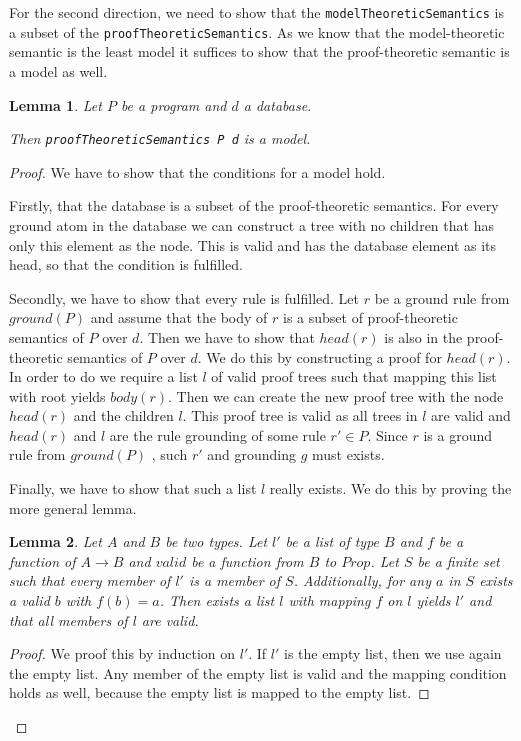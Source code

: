 \documentclass{article}
\newtheorem{lemma}{Lemma}
\begin{document}
        For the second direction, we need to show that the \texttt{modelTheoreticSemantics} is a subset of the \texttt{proofTheoreticSemantics}. As we know that the model-theoretic semantic is the least model it suffices to show that the proof-theoretic semantic is a model as well.

        \begin{lemma}
            Let $P$ be a program and $d$ a database.

            Then \texttt{proofTheoreticSemantics P d} is a model.
        \end{lemma}
        \begin{proof}
            We have to show that the conditions for a model hold.

            Firstly, that the database is a subset of the proof-theoretic semantics. For every ground atom in the database we can construct a tree with no children that has only this element as the node. This is valid and has the database element as its head, so that the condition is fulfilled.

            Secondly, we have to show that every rule is fulfilled. Let $r$ be a ground rule from $ground(P)$ and assume that the body of $r$ is a subset of proof-theoretic semantics of $P$ over $d$. Then we have to show that $head(r)$ is also in the proof-theoretic semantics of $P$ over $d$. We do this by constructing a proof for $head(r)$. In order to do we require a list $l$ of valid proof trees such that mapping this list with root yields $body(r)$. Then we can create the new proof tree with the node $head(r)$ and the children $l$. This proof tree is valid as all trees in $l$ are valid and $head(r)$ and $l$ are the rule grounding of some rule $r' \in P$. Since $r$ is a ground rule from $ground(P)$ , such $r'$ and grounding $g$ must exists.

            Finally, we have to show that such a list $l$ really exists. We do this by proving the more general lemma.

            \begin{lemma}
                Let $A$ and $B$ be two types. Let $l'$ be a list of type $B$ and $f$ be a function of $A \to B$ and $valid$ be a function from $B$ to $Prop$. Let $S$ be a finite set such that every member of $l'$ is a member of $S$. Additionally, for any $a$ in $S$ exists a valid $b$ with $f(b) = a$. Then exists a list $l$ with mapping $f$ on $l$ yields $l'$ and that all members of $l$ are valid.
            \end{lemma}
            \begin{proof}
                We proof this by induction on $l'$.
                If $l'$ is the empty list, then we use again the empty list. Any member of the empty list is valid and the mapping condition holds as well, because the empty list is mapped to the empty list.


\end{proof}
\end{proof}
\end{document}
